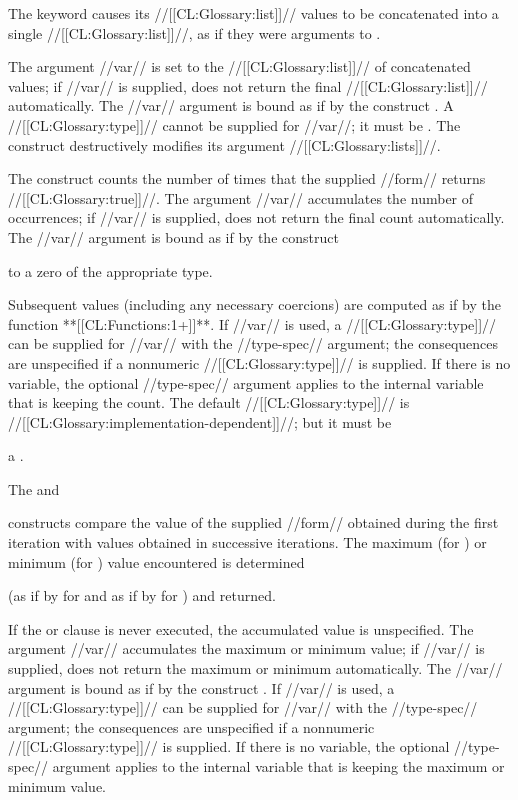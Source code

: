 \itemitem{\bull}
The  keyword causes its //[[CL:Glossary:list]]// values to be concatenated
into a single //[[CL:Glossary:list]]//,
as if they were arguments to .  
\endlist
 
The argument //var// is 
set to the //[[CL:Glossary:list]]// of 
concatenated values; if //var// is supplied, 
does not return the final //[[CL:Glossary:list]]// automatically.  
The //var// argument
is bound as if by the construct .
 A //[[CL:Glossary:type]]// cannot be supplied for //var//; 
it must be .
 The construct  
destructively modifies its argument //[[CL:Glossary:lists]]//.




The  construct counts the number of times 
that the supplied //form// returns //[[CL:Glossary:true]]//.
The argument //var// accumulates the number of occurrences; 
if //var// is supplied, 
 does not return the final count automatically.
The //var// argument is bound as if by the construct  

to a zero of the appropriate type.

Subsequent values (including any necessary coercions) 
are computed as if by the function **[[CL:Functions:1+]]**.
If  //var// is used,
a //[[CL:Glossary:type]]// can be supplied  for //var// with the //type-spec// argument;
the consequences are unspecified if a nonnumeric //[[CL:Glossary:type]]// is supplied.           
If there is no  variable,
the optional //type-spec// argument
applies to the internal variable that is keeping the count.  
The default //[[CL:Glossary:type]]// is //[[CL:Glossary:implementation-dependent]]//; 
but it must be

a .
 



The  and 


constructs compare
the value of the supplied //form// obtained during the first 
iteration with values obtained in successive iterations.
The maximum (for ) or minimum (for ) 
value encountered is determined 

(as if by  for  and
 as if by  for )
and returned.

If the  or  clause
is never executed, the accumulated value is unspecified.
The argument //var// accumulates the maximum or minimum value;
if //var// is supplied,
 does not return the maximum or minimum automatically.
The //var// argument is bound as if by the construct .
If  //var// is used,
a //[[CL:Glossary:type]]// can be supplied for //var// with the //type-spec// argument;
the consequences are unspecified if a nonnumeric //[[CL:Glossary:type]]// is supplied.           
If there is no  variable,
the optional //type-spec// argument applies to the internal variable 
that is keeping the maximum or minimum value.  

